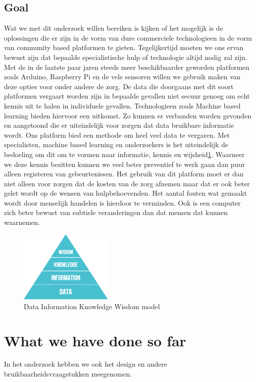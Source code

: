 \documentclass{below-ext}
\begin{document}
\subsection{Goal}
Wat we met dit onderzoek willen bereiken is kijken of het mogelijk is de oplossingen die er zijn in de vorm van dure commerciele technologieen in de vorm van community based platformen te gieten. Tegelijkertijd moeten we ons ervan bewust zijn dat bepaalde specialistische hulp of technologie altijd nodig zal zijn. Met de in de laatste paar jaren steeds meer beschikbaarder geworden platformen zoals Arduino, Raspberry Pi en de vele sensoren willen we gebruik maken van deze opties voor onder andere de zorg. De data die doorgaans met dit soort platformen vergaart worden zijn in bepaalde gevallen niet secuur genoeg om echt kennis uit te halen in individuele gevallen. Technologieen zoals Machine based learning bieden hiervoor een uitkomst. Zo kunnen er verbanden worden gevonden en aangetoond die er uiteindelijk voor zorgen dat data bruikbare informatie wordt. Ons platform bied een methode om heel veel data te vergaren. Met specialisten, machine based learning en onderzoekers is het uiteindelijk de bedoeling om dit om te vormen naar informatie, kennis en wijsheid\ref{fig1:dikw}. Waarneer we deze kennis bezitten kunnen we veel beter preventief te werk gaan dan puur alleen registeren van gebeurtenissen. Het gebruik van dit platform moet er dan niet alleen voor zorgen dat de kosten van de zorg afnemen maar dat er ook beter gelet wordt op de wensen van hulpbehoevenden. Het aantal fouten wat gemaakt wordt door menselijk handelen is hierdoor te verminden. Ook is een computer zich beter bewust van subtiele veranderingen dan dat mensen dat kunnen waarnemen. 
\begin{figure}
\center
\label{fig1:dikw}
\includegraphics[width=0.4\textwidth]{dikw}
\caption{Data Information Knowledge Wisdom model}
\end{figure}
\section{What we have done so far}
In het onderzoek hebben we ook het design en andere bruikbaarheidsvraagstukken meegenomen. 
\end{document}

